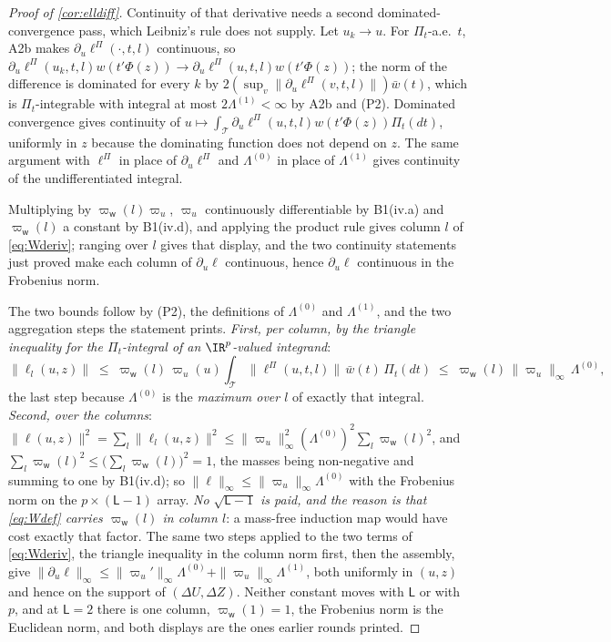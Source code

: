 \begin{proof}[Proof of \cref{cor:elldiff}]
Continuity of that derivative needs a second dominated-convergence pass, which Leibniz's rule does
not supply. Let $u_k\to u$. For $\Pi_t$-a.e.\ $t$,
A2b makes $\partial_u\ell^\Pi(\cdot,t,l)$ continuous, so
$\partial_u\ell^\Pi(u_k,t,l)w(t'\Phi(z))\to\partial_u\ell^\Pi(u,t,l)w(t'\Phi(z))$; the norm of the
difference is
dominated for every $k$ by $2(\sup_v\|\partial_u\ell^\Pi(v,t,l)\|)\bar w(t)$, which is
$\Pi_t$-integrable with integral at most $2\Lambda^{(1)}<\infty$ by A2b and (P2). Dominated
convergence gives continuity of $u\mapsto\int_{\mathcal T}\partial_u\ell^\Pi(u,t,l)w(t'\Phi(z))\Pi_t(dt)$,
uniformly in $z$ because the dominating function does not depend on $z$. The same argument with
$\ell^\Pi$ in place of $\partial_u\ell^\Pi$ and $\Lambda^{(0)}$ in place of
$\Lambda^{(1)}$ gives continuity of the undifferentiated integral.

Multiplying by $\varpi_{\mathsf w}(l)\varpi_u$, $\varpi_u$ continuously differentiable by B1(iv.a) and
$\varpi_{\mathsf w}(l)$ a constant by B1(iv.d), and applying the product
rule gives column $l$ of \eqref{eq:Wderiv}; ranging over $l$ gives that display, and the two continuity
statements just proved make each column of $\partial_u\ell$ continuous, hence $\partial_u\ell$ continuous
in the Frobenius norm.

The two bounds follow by (P2), the definitions of $\Lambda^{(0)}$ and $\Lambda^{(1)}$, and the two
aggregation steps the statement prints. \emph{First, per column, by the triangle inequality for the
$\Pi_t$-integral of an $\IR^{p}$-valued integrand}:
\[
\big\|\ell_l(u,z)\big\|\;\le\;\varpi_{\mathsf w}(l)\,\varpi_u(u)\!\int_{\mathcal T}\!\big\|\ell^\Pi(u,t,l)\big\|\,\bar w(t)\,\Pi_t(dt)
\;\le\;\varpi_{\mathsf w}(l)\,\|\varpi_u\|_\infty\,\Lambda^{(0)} ,
\]
the last step because $\Lambda^{(0)}$ is the \emph{maximum over $l$} of exactly that integral. \emph{Second,
over the columns}: $\|\ell(u,z)\|^{2}=\sum_l\|\ell_l(u,z)\|^{2}
\le\|\varpi_u\|_\infty^{2}(\Lambda^{(0)})^{2}\sum_l\varpi_{\mathsf w}(l)^{2}$, and
$\sum_l\varpi_{\mathsf w}(l)^{2}\le\big(\sum_l\varpi_{\mathsf w}(l)\big)^{2}=1$, the masses being
non-negative and summing to one by B1(iv.d); so $\|\ell\|_\infty\le\|\varpi_u\|_\infty\Lambda^{(0)}$ with
the Frobenius norm on the $p\times(\mathsf L-1)$ array. \emph{No $\sqrt{\mathsf L-1}$ is paid, and the
reason is that \eqref{eq:Wdef} carries $\varpi_{\mathsf w}(l)$ in column $l$}: a mass-free induction map
would have cost exactly that factor.
The same two steps applied to the two terms of \eqref{eq:Wderiv}, the triangle inequality in the
column norm first, then the assembly, give
$\|\partial_u\ell\|_\infty\le\|\varpi_u'\|_\infty\Lambda^{(0)}+\|\varpi_u\|_\infty\Lambda^{(1)}$,
both uniformly in $(u,z)$ and hence on the support of $(\Delta U,\Delta Z)$.
Neither constant moves with $\mathsf L$ or with $p$, and at $\mathsf L=2$ there is one column,
$\varpi_{\mathsf w}(1)=1$, the Frobenius norm is the Euclidean norm, and both displays are the ones
earlier rounds printed.


\end{proof}
